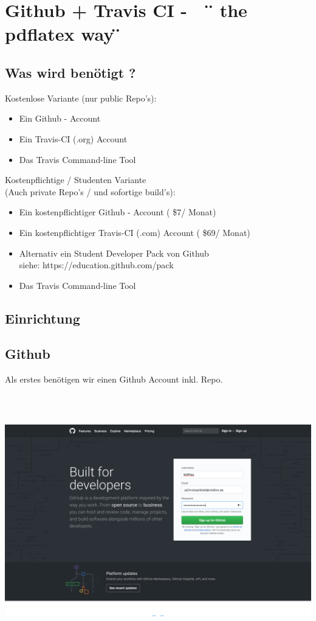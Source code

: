 
\newpage

\section{Github + Travis CI - \ \  \"{} the pdflatex way \"{}}
\subsection{Was wird benötigt ?}
{\color{green}Kostenlose} Variante (nur public Repo's):
\begin{itemize}
  \item Ein Github - Account
  \item Ein Travis-CI (.org) Account
  \item Das Travis Command-line Tool
\end{itemize}
\vspace{0.5cm}
{\color{red}Kostenpflichtige} / Studenten Variante \\(Auch private Repo's / und sofortige build's):
\begin{itemize}
  \item Ein kostenpflichtiger Github - Account ( \$7/ Monat)
  \item Ein kostenpflichtiger Travis-CI (.com) Account ( \$69/ Monat)
  \item Alternativ ein Student Developer Pack von Github \\ siehe: https://education.github.com/pack
  \item Das Travis Command-line Tool
\end{itemize}


%
%
%
\newpage
\subsection{Einrichtung}
\subsection{Github}
Als erstes benötigen wir einen Github Account inkl. Repo.
\begin{center}
  \includegraphics[trim = 300px 10px 300px 0px, clip,height=11cm]{./bilder/1Github.png}
\end{center}

